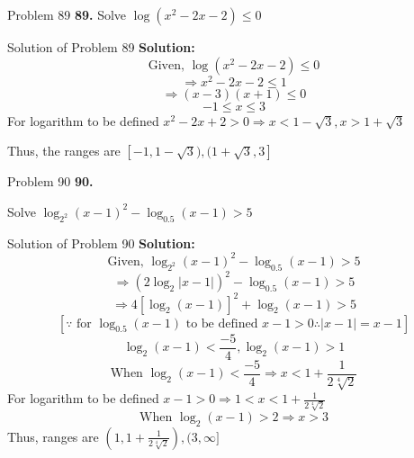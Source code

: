 \documentclass[aspectratio=1610,8pt]{beamer}
\begin{document}
\begin{frame}{Problem 89}
  \textbf{89.} Solve $\log(x^2 - 2x - 2)\leq 0$
\end{frame}
\begin{frame}{Solution of Problem 89}
  \textbf{Solution:} $$\text{Given,~}\log(x^2 - 2x - 2)\leq 0$$
  $$\Rightarrow x^2 - 2x - 2 \leq 1$$
  $$\Rightarrow (x - 3)(x + 1)\leq 0$$
  $$-1 \leq x \leq 3$$
  For logarithm to be defined $x^2 - 2x + 2 > 0 \Rightarrow x < 1 - \sqrt{3}, x > 1 + \sqrt{3}$

  Thus, the ranges are $[-1, 1 - \sqrt{3}), (1 + \sqrt{3}, 3]$
\end{frame}
\begin{frame}{Problem 90}
  \textbf{90.}
\end{frame} Solve $\log_{2^2}(x - 1)^2 - \log_{0.5}(x - 1)> 5$
\begin{frame}{Solution of Problem 90}
  \textbf{Solution:} $$\text{Given,~}\log_{2^2}(x - 1)^2 - \log_{0.5}(x - 1)> 5$$
  $$\Rightarrow (2\log_2|x - 1|)^2 - \log_{0.5}(x - 1) > 5$$
  $$\Rightarrow 4[\log_2(x - 1)]^2 + \log_2(x - 1) > 5$$
  $$[\because \text{~for~}\log_{0.5}(x - 1) \text{~to be defined~} x- 1> 0 \therefore |x - 1| = x -1]$$
  $$\log_2(x - 1)< \frac{-5}{4}, \log_2(x - 1) > 1$$
  $$\text{When~}\log_2(x - 1)<\frac{-5}{4} \Rightarrow x < 1 + \frac{1}{2\sqrt[4]{2}}$$
  For logarithm to be defined $x - 1>0 \Rightarrow 1< x < 1 + \frac{1}{2\sqrt[4]{2}}$
  $$\text{When~}\log_2(x - 1)> 2 \Rightarrow x > 3$$
  Thus, ranges are $\left(1, 1 + \frac{1}{2\sqrt[4]{2}}\right), (3, \infty]$
\end{frame}
\end{document}
